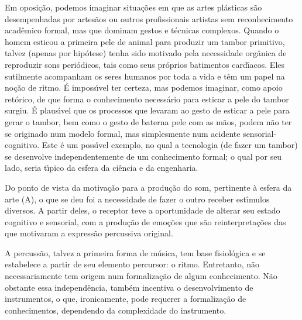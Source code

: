 \documentclass[
12pt,		%
openright,	%
twoside,  %
a4paper,			%
chapter=TITLE,		%
english,			%
french,				%
spanish,			%
brazil				%
]{USPSC-classe/USPSC}
\begin{document}
Em oposi\c{c}\~ao, podemos imaginar situa\c{c}\~oes em que as artes pl\'asticas s\~ao desempenhadas por artes\~aos ou outros profissionais artistas sem reconhecimento acad\^emico formal, mas que dominam gestos e t\'ecnicas complexos. Quando o homem esticou a primeira pele de animal para produzir um tambor primitivo, talvez (apenas por hip\'otese) tenha sido motivado pela necessidade org\^anica de reproduzir sons peri\'odicos, tais como seus pr\'oprios batimentos card\'{\i}acos. Eles sutilmente acompanham os seres humanos por toda a vida e t\^em um papel na no\c{c}\~ao de ritmo. \'E imposs\'{\i}vel ter certeza, mas podemos imaginar, como apoio ret\'orico, de que forma o conhecimento necess\'ario para esticar a pele do tambor surgiu. \'E plaus\'{\i}vel que os processos que levaram ao gesto de esticar a pele para gerar o tambor, bem como o gesto de \textquotedbl bater\textquotedbl  na pele com as m\~aos, podem n\~ao ter se originado num modelo formal, mas simplesmente num acidente sensorial-cognitivo. Este \'e um poss\'{\i}vel exemplo, no qual a tecnologia (de fazer um tambor) se desenvolve independentemente de um conhecimento formal; o qual por seu lado, seria t\'{\i}pico da esfera da ci\^encia e da engenharia.

















Do ponto de vista da motiva\c{c}\~ao para a produ\c{c}\~ao do som, pertinente \`a esfera da arte (A), o que se deu foi a necessidade de fazer o outro receber est\'{\i}mulos diversos. A partir deles, o receptor teve a oportunidade de alterar seu estado cognitivo e sensorial, com a produ\c{c}\~ao de emo\c{c}\~oes que s\~ao reinterpreta\c{c}\~oes das que motivaram a express\~ao percussiva original.

















A percuss\~ao, talvez a primeira forma de m\'usica, tem base fisiol\'ogica e se estabelece a partir de seu elemento percursor: o ritmo. Entretanto, n\~ao necessariamente tem origem num formaliza\c{c}\~ao de algum conhecimento. N\~ao obstante essa independ\^encia, tamb\'em incentiva o desenvolvimento de instrumentos, o que, ironicamente, pode requerer a formaliza\c{c}\~ao de conhecimentos, dependendo da complexidade do instrumento.
\end{document}
